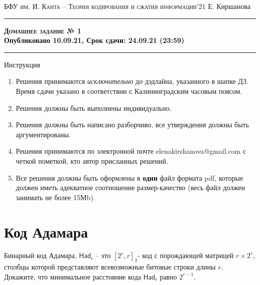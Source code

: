 \documentclass[11pt]{exam}
\theoremstyle{definition}
\begin{document}
	{\noindent
		\textsc{БФУ им. И. Канта -- Теория кодирования и сжатия информации'21}
		\hfill {Е. Киршанова \\}
	\hrule
	\begin{center}
		{\Large\textbf{
				\textsc{Домашнее задание № 1} \\[5pt] {Опубликовано 10.09.21, Срок сдачи: 24.09.21 (23:59)}
		} } 
	\end{center}
	\hrule \vspace{5mm}
	
	\thispagestyle{empty}
	
	\vspace{0.2cm}
	
	\noindent \textsf{Инструкция}
	
	\begin{enumerate}
		\itemsep 2pt
		\item Решения принимаются \emph{исключительно} до дэдлайна, указанного в шапке ДЗ. Время сдачи указано в соответствии с Калининградским часовым поясом.
		\item Решения должны быть выполнены индивидуально.
		\item Решения должны быть написано разборчиво,  все утверждения должны быть аргументированы.
		\item Решения принимаются по электронной почте \textsf{elenakirshanova@gmail.com} с четкой пометкой, кто автор присланных решений.
		\item Все решения должны быть оформлены в \textbf{один} файл формата {pdf}, которые должен иметь адекватное соотношение размер-качество (весь файл должен занимать не более 15Мb).
	\end{enumerate}	
	\section{Код Адамара}
	Бинарный код Адамара, $\mathsf{Had_r}$ -- это  $[2^r, r]_2$- код с порождающей матрицей $r \times 2^r$, столбцы которой представляют всевозможные битовые строки длины $r$. Докажите, что минимальное расстояние кода $\mathsf{Had_r}$  равно $2^{r-1}$.

		
}
\end{document}
